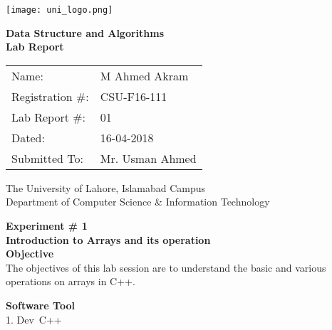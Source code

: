 \documentclass[11pt]{article}            %
\begin{document}
\begin{titlepage}
    \centering
  \vfill
    \texttt{[image: uni\_logo.png]} \\ 
	\vskip2cm
    {\bfseries\Large
	Data Structure and Algorithms \\ 
	
	\vskip2cm
	Lab Report 
	 
	\vskip2cm
	}    

\begin{center}
\begin{tabular}{ l l  } 

Name: & M Ahmed Akram \\ 
Registration \#: & CSU-F16-111 \\ 
Lab Report \#: & 01 \\ 
 Dated:& 16-04-2018\\ 
Submitted To:& Mr. Usman Ahmed\\ 

\end{tabular}
\end{center}
    \vfill
    The University of Lahore, Islamabad Campus\\
Department of Computer Science \& Information Technology
\end{titlepage}


    
    {\bfseries\Large
\centering
	Experiment \# 1 \\

Introduction to Arrays and its operation \\
	
	}    
 \vskip1cm
 \textbf {Objective}\\  The objectives of this lab session are to understand the basic and various operations on arrays in C++. 
 
 \textbf {Software Tool} \\
1.   Dev\ C++
\end{document}

